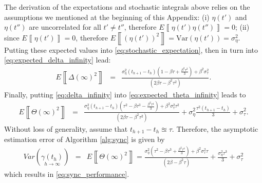 \documentclass[journal,draftcls,onecolumn,12pt,twoside]{IEEEtranTCOM}
\newcommand{\expected}[1]{E\left\llbracket #1 \right\rrbracket}
\begin{document}
The derivation of the expectations and stochastic integrals above relies on the 
assumptions we mentioned 
at the beginning of this Appendix: (i) $\eta(t')$ and $\eta(t'')$ are 
uncorrelated for all $t'\neq t''$, therefore $\expected{\eta(t')\eta(t'')}=0$; 
(ii) since $\expected{\eta(t')}=0$, therefore 
$\expected{(\eta(t'))^2}=\mathrm{Var}(\eta(t'))=\sigma_{\eta}^2$. Putting these 
expected 
values into \eqref{eq:stochastic_expectation}, then in 
turn into \eqref{eq:expected_delta_infinity} lead:
\begin{eqnarray}
\expected{\Delta(\infty)^2}
& = &
\frac{\sigma^2_{\eta}(t_{h+1}-t_h)\left(1-\beta\tau+\frac{\beta^2\tau^2}{3}\right)+\beta^2\sigma^2_{\tau}}{(2\beta\tau-\beta^2\tau^2)}.
\label{eq:delta_infinity}
\end{eqnarray}
Finally, putting \eqref{eq:delta_infinity} into 
\eqref{eq:expected_theta_infinity} 
leads to
\begin{eqnarray}
\expected{\Theta(\infty)^2} & = & 
\frac{\sigma^2_{\eta}(t_{h+1}-t_h)\left(\tau^2
	-\beta\tau^3-\frac{\beta^2\tau^4}{3}\right)
	+\beta^2\sigma^2_{\tau}\tau^2}{(2\beta\tau-\beta^2\tau^2)} + 
\sigma^2_{\eta}\frac{\tau^2(t_{h+1}-t_h)}{3}+\sigma^2_{\tau}.
\end{eqnarray}
Without loss of generality, assume that $t_{h+1}-t_h\approxeq\tau$. Therefore, 
the asymptotic estimation error of Algorithm \ref{alg:sync} is given by
\begin{eqnarray}
Var\left(\underset{h\rightarrow\infty}{\gamma(t_h)}\right)& = & 
\expected{\Theta(\infty)^2} = 
\frac{\sigma^2_{\eta}\left(\tau^2-\beta\tau^3
	+\frac{\beta^2\tau^4}{3}\right)
	+\beta^2\sigma^2_{\tau}\tau}{(2\beta-\beta^2\tau)}+\frac{\sigma^2_{\eta}\tau^3}{3}
+  \sigma^2_{\tau}
\end{eqnarray}
which results in \eqref{eq:sync_performance}.
\end{document}
